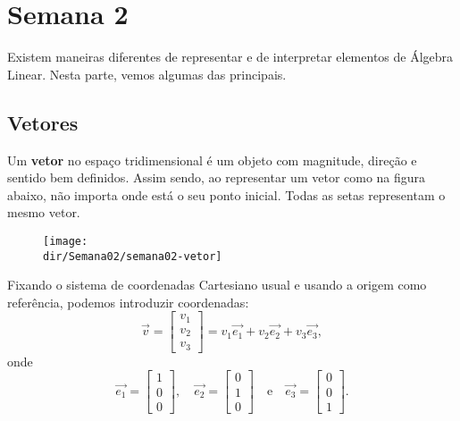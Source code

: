 \documentclass[../livro.tex]{subfiles}  %
\providecommand{\dir}{..}
\begin{document}
\chapter{Semana 2}

\vspace{0.5cm}

Existem maneiras diferentes de representar e de interpretar elementos de Álgebra Linear. Nesta parte, vemos algumas das principais.


\section{Vetores}

Um \textbf{vetor} no espaço tridimensional é um objeto com magnitude, direção e sentido bem definidos. Assim sendo, ao representar um vetor como na figura abaixo, não importa onde está o seu ponto inicial. Todas as setas representam o mesmo vetor.

\begin{figure}[h!]
\begin{center}
\texttt{[image: \\dir/Semana02/semana02-vetor]}
\end{center}
\end{figure}

Fixando o sistema de coordenadas Cartesiano usual e usando a origem como referência, podemos introduzir coordenadas:
\begin{equation}
\vec{v} =
\left[
  \begin{array}{c}
    v_1 \\
    v_2 \\
    v_3
  \end{array}
\right]
= v_1 \vec{e_1} + v_2 \vec{e_2} + v_3 \vec{e_3},
\end{equation} onde
\begin{equation}
\vec{e_1} =
\left[
  \begin{array}{c}
    1 \\
    0 \\
    0
  \end{array}
\right], \quad
\vec{e_2} =
\left[
  \begin{array}{c}
    0 \\
    1 \\
    0
  \end{array}
\right] \quad  \text{e} \quad
\vec{e_3} =
\left[
  \begin{array}{c}
    0 \\
    0 \\
    1
  \end{array}
\right].
\end{equation} 
\end{document}
